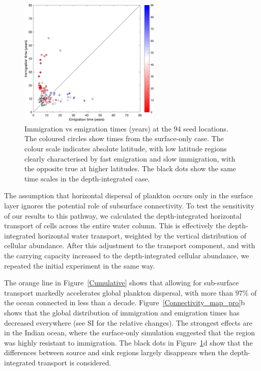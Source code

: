\documentclass[12pt]{article}
\begin{document}
\begin{figure}[t!]
    \centering
        \includegraphics[width=0.6\textwidth]{../Figures/imm_vs_em.png}
    \caption{Immigration vs emigration times (years) at the 94 seed locations. The coloured circles show times from the surface-only case. The colour scale indicates absolute latitude, with low latitude regions clearly characterised by fast emigration and slow immigration, with the opposite true at higher latitudes. The black dots show the same time scales in the depth-integrated case.}
\label{Imm_vs_em}
\end{figure}

The assumption that horizontal dispersal of plankton occurs only in the surface layer ignores the potential role of subsurface connectivity. To test the sensitivity of our results to this pathway, we calculated the depth-integrated horizontal transport of cells across the entire water column. This is effectively the depth-integrated horizontal water transport, weighted by the vertical distribution of cellular abundance. After this adjustment to the transport component, and with the carrying capacity increased to the depth-integrated cellular abundance, we repeated the initial experiment in the same way. 

The orange line in Figure~\ref{Cumulative} shows that allowing for sub-surface transport markedly accelerates global plankton dispersal, with more than 97\% of the ocean connected in less than a decade. Figure~\ref{Connectivity_map_pro}b shows that the global distribution of immigration and emigration times has decreased everywhere (see SI for the relative changes). The strongest effects are in the Indian ocean, where the surface-only simulation suggested that the region was highly resistant to immigration. The black dots in Figure~\ref{Imm_vs_em}d show that the differences between source and sink regions largely disappears when the depth-integrated transport is considered. 
\end{document}
